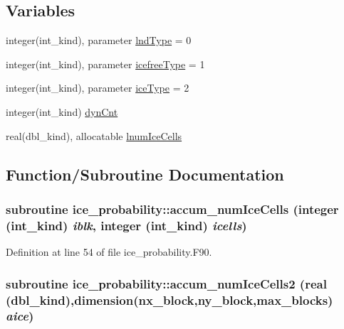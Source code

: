 \subsection*{Variables}
\begin{DoxyCompactItemize}
\item 
integer(int\_\-kind), parameter \hyperlink{namespaceice__probability_aaabce4689cd62ee3719275cd92df9912}{lndType} = 0
\item 
integer(int\_\-kind), parameter \hyperlink{namespaceice__probability_ac98da6fa34da83bf3df15cd5c9e6e2e5}{icefreeType} = 1
\item 
integer(int\_\-kind), parameter \hyperlink{namespaceice__probability_afcfe5a08d7e0f132380df3a8716e38df}{iceType} = 2
\item 
integer(int\_\-kind) \hyperlink{namespaceice__probability_a4ee8ce398fcfff914562169106ab0f2e}{dynCnt}
\item 
real(dbl\_\-kind), allocatable \hyperlink{namespaceice__probability_a15428ca096f845ed45a6caddd622c7c8}{lnumIceCells}
\end{DoxyCompactItemize}


\subsection{Function/Subroutine Documentation}
\hypertarget{namespaceice__probability_af4690e52bcf824f65d95ef537d2820b2}{
\subsubsection[{accum\_\-numIceCells}]{\setlength{\rightskip}{0pt plus 5cm}subroutine ice\_\-probability::accum\_\-numIceCells (integer (int\_\-kind) {\em iblk}, \/  integer (int\_\-kind) {\em icells})}}
\label{namespaceice__probability_af4690e52bcf824f65d95ef537d2820b2}


Definition at line 54 of file ice\_\-probability.F90.\hypertarget{namespaceice__probability_ab54f919c558a646e53b7587961da2c48}{
\subsubsection[{accum\_\-numIceCells2}]{\setlength{\rightskip}{0pt plus 5cm}subroutine ice\_\-probability::accum\_\-numIceCells2 (real (dbl\_\-kind),dimension(nx\_\-block,ny\_\-block,max\_\-blocks) {\em aice})}}
\label{namespaceice__probability_ab54f919c558a646e53b7587961da2c48}


